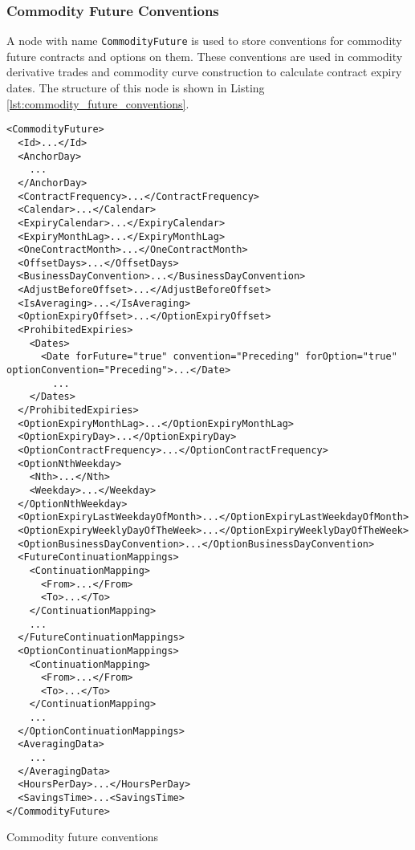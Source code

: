 \subsubsection{Commodity Future Conventions}
\label{sec:commodity_future_conventions}
A node with name \lstinline!CommodityFuture! is used to store conventions for commodity future contracts and options on them. These conventions are used in commodity derivative trades and commodity curve construction to calculate contract expiry dates. The structure of this node is shown in Listing \ref{lst:commodity_future_conventions}.

\begin{listing}[h!]
\begin{verbatim}
<CommodityFuture>
  <Id>...</Id>
  <AnchorDay>
    ...
  </AnchorDay>
  <ContractFrequency>...</ContractFrequency>
  <Calendar>...</Calendar>
  <ExpiryCalendar>...</ExpiryCalendar>
  <ExpiryMonthLag>...</ExpiryMonthLag>
  <OneContractMonth>...</OneContractMonth>
  <OffsetDays>...</OffsetDays>
  <BusinessDayConvention>...</BusinessDayConvention>
  <AdjustBeforeOffset>...</AdjustBeforeOffset>
  <IsAveraging>...</IsAveraging>
  <OptionExpiryOffset>...</OptionExpiryOffset>
  <ProhibitedExpiries>
    <Dates>
      <Date forFuture="true" convention="Preceding" forOption="true" optionConvention="Preceding">...</Date>
        ...
    </Dates>
  </ProhibitedExpiries>
  <OptionExpiryMonthLag>...</OptionExpiryMonthLag>
  <OptionExpiryDay>...</OptionExpiryDay>
  <OptionContractFrequency>...</OptionContractFrequency>
  <OptionNthWeekday>
    <Nth>...</Nth>
    <Weekday>...</Weekday>
  </OptionNthWeekday>
  <OptionExpiryLastWeekdayOfMonth>...</OptionExpiryLastWeekdayOfMonth>
  <OptionExpiryWeeklyDayOfTheWeek>...</OptionExpiryWeeklyDayOfTheWeek>
  <OptionBusinessDayConvention>...</OptionBusinessDayConvention>
  <FutureContinuationMappings>
    <ContinuationMapping>
      <From>...</From>
      <To>...</To>
    </ContinuationMapping>
    ...
  </FutureContinuationMappings>
  <OptionContinuationMappings>
    <ContinuationMapping>
      <From>...</From>
      <To>...</To>
    </ContinuationMapping>
    ...
  </OptionContinuationMappings>
  <AveragingData>
    ...
  </AveragingData>
  <HoursPerDay>...</HoursPerDay>
  <SavingsTime>...<SavingsTime>
</CommodityFuture>
\end{verbatim}
\caption{Commodity future conventions}
\label{lst:commodity_future_conventions}
\end{listing}

